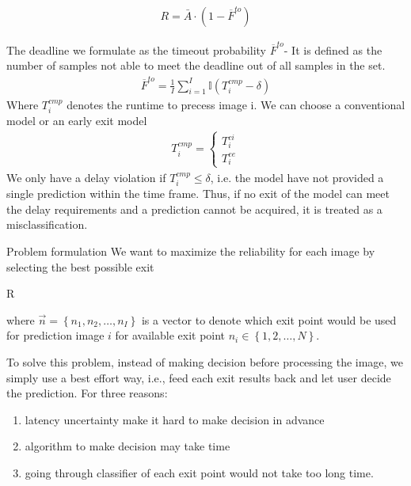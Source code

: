 \begin{enumdescript}
	\begin{align}
	R= \bar{A} \cdot (1-\overline{F}^{to})
	\end{align}
	
	The deadline we formulate as the timeout probability $ \overline{F}^{to} $- It is defined as the number of samples not able to meet the deadline out of all samples in the set.
	\begin{align}
	\overline{F}^{to}=\frac{1}{I}\sum_{i=1}^{I} \mathbb{I}\left(T_{i}^{cmp}-\delta\right)
	\end{align}
	Where $ T_{i}^{cmp} $ denotes the runtime to precess image i. We can choose a conventional model or an early exit model 
	\begin{align}
		T^{cmp}_i = \begin{cases}
			T^{ci}_i \\
			T^{ee}_i
		\end{cases}
	\end{align}
	We only have a delay violation if $ T_i^{cmp} \leq \delta $, i.e. the model have not provided a single prediction within the time frame. Thus, if no exit of the model can meet the delay requirements and a prediction cannot be acquired, it is treated as a misclassification. 
		
	\item[Problem formulation] We want to maximize the reliability for each image by selecting the best possible exit
	\begin{maxi}
		{}{R}
		{}{}
	\end{maxi}
	where $ \vec{n} = \left\{ n_1, n_2, \dots, n_I \right\}$ is a vector to denote which exit point would be used for prediction image $ i $ for available exit point $ n_i \in \left\{1,2, \dots, N\right\} $.
	
	To solve this problem, instead of making decision before processing the image, we simply use a best effort way, i.e., feed each exit results back and let user decide the prediction. For three reasons:
	\begin{enumerate}
		\item latency uncertainty make it hard to make decision in advance
		\item algorithm to make decision may take time
		\item going through classifier of each exit point would not take too long time.
	\end{enumerate}
		
	\end{enumdescript}


